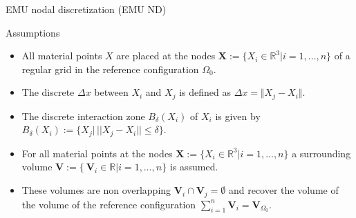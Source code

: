 \documentclass[\classoption]{beamer}
\newcommand{\dx}{{\Delta x}}
\begin{document}
\begin{frame}{EMU nodal discretization (EMU ND)}

\begin{block}{Assumptions}
\begin{itemize}
\item All material points $X$ are placed at the nodes $\mathbf{X}:=\lbrace X_i \in \mathbb{R}^3\vert i=1,\ldots,n\rbrace$ of a regular grid in the reference configuration $\Omega_0$.
\item The discrete  $\dx$ between $X_i$ and $X_j$ is defined as $\dx = \Vert X_j - X_i \Vert$.
\item  The discrete interaction zone $B_\delta(X_i)$ of $X_i$ is given by $B_\delta(X_i):=\lbrace X_j \vert \,\vert\vert X_j-X_i\vert\vert \leq \delta\rbrace$.
\item For all material points at the nodes $\mathbf{X}:=\lbrace X_i \in \mathbb{R}^3\vert i=1,\ldots,n\rbrace$ a surrounding volume $\mathbf{V}:=\lbrace\ \mathbf{V}_i \in \mathbb{R}\vert i=1,\ldots,n\rbrace$ is assumed.
\item These volumes are non overlapping $\mathbf{V}_i \cap \mathbf{V}_j = \emptyset$ and recover the volume of the volume of the reference configuration $\sum_{i=1}^n \mathbf{V}_i = \mathbf{V}_{\Omega_0}$.
\end{itemize}
\end{block}
\end{frame}
\end{document}
